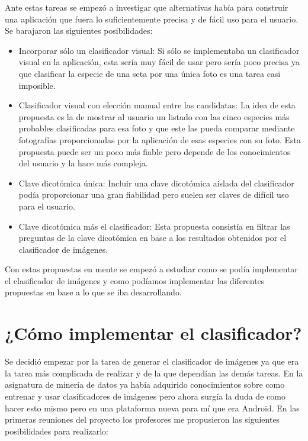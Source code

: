 Ante estas tareas se empezó a investigar que alternativas había para construir una aplicación que fuera lo suficientemente precisa y de fácil uso para el usuario. Se barajaron las siguientes posibilidades:

\begin{itemize}
	\item{Incorporar sólo un clasificador visual:} Si sólo se implementaba un clasificador visual en la aplicación, esta sería muy fácil de usar pero sería poco precisa ya que clasificar la especie de una seta por una única foto es una tarea casi imposible. 
	\item{Clasificador visual con elección manual entre las candidatas:} La idea de esta propuesta es la de mostrar al usuario un listado con las cinco especies más probables clasificadas para esa foto y que este las pueda comparar mediante fotografías proporcionadas por la aplicación de esas especies con su foto. Esta propuesta puede ser un poco más fiable pero depende de los conocimientos del usuario y la hace más compleja.
	\item{Clave dicotómica única:} Incluir una clave dicotómica aislada del clasificador podía proporcionar una gran fiabilidad pero suelen ser claves de difícil uso para el usuario.
	\item{Clave dicotómica más el clasificador:} Esta propuesta consistía en filtrar las preguntas de la clave dicotómica en base a los resultados obtenidos por el clasificador de imágenes.
\end{itemize}

Con estas propuestas en mente se empezó a estudiar como se podía implementar el clasificador de imágenes y como podíamos implementar las diferentes propuestas en base a lo que se iba desarrollando.

\section{¿Cómo implementar el clasificador?}

Se decidió empezar por la tarea de generar el clasificador de imágenes ya que era la tarea más complicada de realizar y de la que dependían las demás tareas. En la asignatura de minería de datos ya había adquirido conocimientos sobre como entrenar y usar clasificadores de imágenes pero ahora surgía la duda de como hacer esto mismo pero en una plataforma nueva para mí que era Android. En las primeras reuniones del proyecto los profesores me propusieron las siguientes posibilidades para realizarlo:

